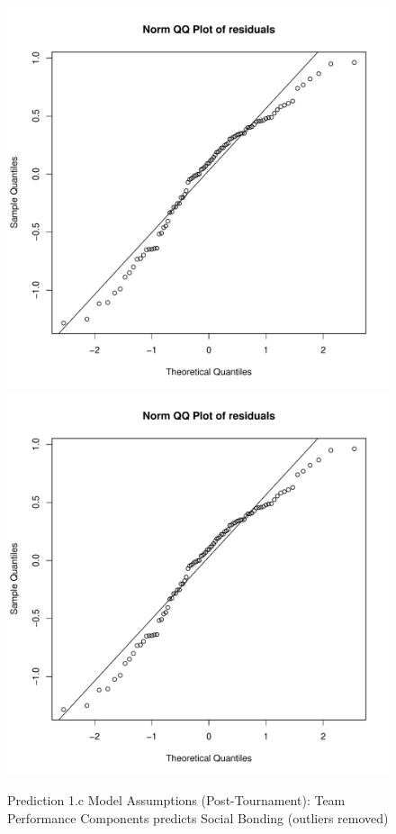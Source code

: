 \begin{CJK}{UTF8}{gbsn}
\begin{figure}[!htbp]
              \includegraphics[scale =.4]{images/MLM3aOutQQNorm.pdf}
              \includegraphics[scale =.4]{images/MLM3aOutCooksD.pdf}
              \caption{Prediction 1.c Model Assumptions (Post-Tournament): Team Performance Components predicts Social Bonding (outliers removed)}
             \label{fig:MLM3aOutAssumptions}
            \end{figure}



\end{CJK}
